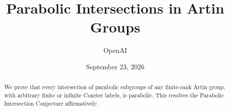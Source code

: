 \documentclass[11pt]{article}
\title{Parabolic Intersections in Artin Groups}
\author{OpenAI}
\date{September 23, 2026}
\numberwithin{equation}{section}
\theoremstyle{definition}
\begin{document}
\maketitle
\begin{abstract}
We prove that every intersection of parabolic subgroups of any finite-rank
Artin group, with arbitrary finite or infinite Coxeter labels, is parabolic.
This resolves the Parabolic Intersection Conjecture affirmatively.
\end{abstract}
\tableofcontents










\begingroup
\small


\endgroup
\end{document}
